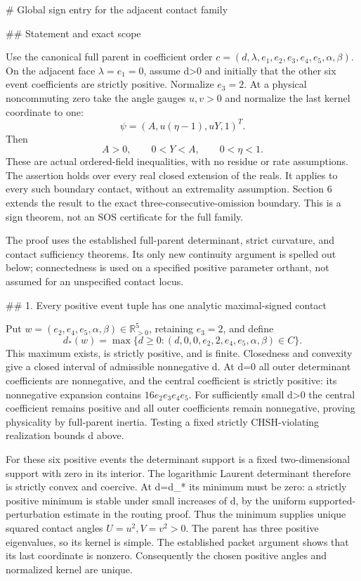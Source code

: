 # Global sign entry for the adjacent contact family

## Statement and exact scope

Use the canonical full parent in coefficient order
\(c=(d,\lambda,e_1,e_2,e_3,e_4,e_5,\alpha,\beta)\).
On the adjacent face \(\lambda=e_1=0\), assume d>0 and initially that the other six event
coefficients are strictly positive. Normalize \(e_3=2\). At a physical
noncommuting zero take the angle gauges \(u,v>0\) and normalize the last
kernel coordinate to one:
\[
\psi=(A,u(\eta-1),uY,1)^T.
\]
Then
\[
\boxed{A>0,\qquad 0<Y<A,\qquad 0<\eta<1.}
\tag{1}
\]
These are actual ordered-field inequalities, with no residue or rate
assumptions. The assertion holds over every real closed extension of the
reals. It applies to every such boundary contact, without an extremality
assumption. Section 6 extends the result to the exact three-consecutive-omission
boundary. This is a sign theorem, not an SOS certificate for the full family.

The proof uses the established full-parent determinant, strict curvature,
and contact sufficiency theorems. Its only new continuity argument is
spelled out below; connectedness is used on a specified positive parameter
orthant, not assumed for an unspecified contact locus.

## 1. Every positive event tuple has one analytic maximal-signed contact

Put \(w=(e_2,e_4,e_5,\alpha,\beta)\in\mathbb R_{>0}^5\), retaining
\(e_3=2\), and define
\[
d_*(w)=\max\{d\ge0:(d,0,0,e_2,2,e_4,e_5,\alpha,\beta)\in C\}.
\tag{2}
\]
This maximum exists, is strictly positive, and is finite. Closedness and
convexity give a closed interval of admissible nonnegative d. At d=0 all
outer determinant coefficients are nonnegative, and the central coefficient
is strictly positive: its nonnegative expansion contains
\(16e_2e_3e_4e_5\). For sufficiently small d>0 the central coefficient
remains positive and all outer coefficients remain nonnegative, proving
physicality by full-parent inertia. Testing a fixed strictly CHSH-violating
realization bounds d above.

For these six positive events the determinant support is a fixed
two-dimensional support with zero in its interior. The logarithmic Laurent
determinant therefore is strictly convex and coercive. At d=d_* its minimum
must be zero: a strictly positive minimum is stable under small increases
of d, by the uniform supported-perturbation estimate in the routing proof.
Thus the minimum supplies unique squared contact angles \(U=u^2,V=v^2>0\).
The parent has three positive eigenvalues, so its kernel is simple. The
established packet argument shows that its last coordinate is nonzero.
Consequently the chosen positive angles and normalized kernel are unique.

